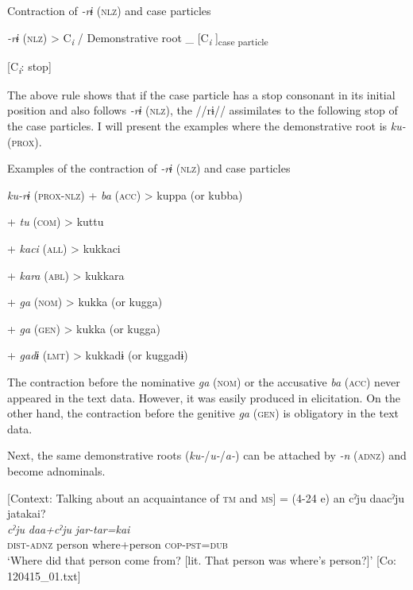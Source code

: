 \ea \label{ex:5:20}   Contraction of \textit{{}-rɨ} (\textsc{nlz}) and case particles

  \textit{{}-rɨ} (\textsc{nlz})  >  C\textit{\textsubscript{i}}  /  Demonstrative root  \_  [C\textit{\textsubscript{i}}      ]\textsubscript{case particle}

                [C\textit{\textsubscript{i}}: stop]
\z

The above rule shows that if the case particle has a stop consonant in its initial position and also follows \textit{{}-rɨ} (\textsc{nlz}), the //rɨ// assimilates to the following stop of the case particles. I will present the examples where the demonstrative root is \textit{ku-} (\textsc{prox}).

\ea \label{ex:5:21}   Examples of the contraction of \textit{{}-rɨ} (\textsc{nlz}) and case particles

  \textit{ku-rɨ}  (\textsc{prox}-\textsc{nlz})  +  \textit{ba}  (\textsc{acc})  >  kuppa  (or kubba)

      +  \textit{tu}  (\textsc{com})  >  kuttu

      +  \textit{kaci}  (\textsc{all})  >  kukkaci

      +  \textit{kara}  (\textsc{abl})  >  kukkara

      +  \textit{ga}  (\textsc{nom})  >  kukka  (or kugga)

      +  \textit{ga}  (\textsc{gen})  >  kukka  (or kugga)

      +  \textit{gadɨ}  (\textsc{lmt})  >  kukkadɨ  (or kuggadɨ)
\z

The contraction before the nominative \textit{ga} (\textsc{nom}) or the accusative \textit{ba} (\textsc{acc}) never appeared in the text data. However, it was easily produced in elicitation. On the other hand, the contraction before the genitive \textit{ga} (\textsc{gen}) is obligatory in the text data.

Next, the same demonstrative roots (\textit{ku-}/\textit{u-}/\textit{a-}) can be attached by \textit{{}-n} (\textsc{adnz}) and become adnominals.

\ea \label{ex:5:22}   [Context: Talking about an acquaintance of \textsc{tm} and \textsc{ms}] = (4-24 e)
\glll  an  cˀju  daacˀju  jatakai?\\
\textit{}  \textit{cˀju}  \textit{daa+cˀju}  \textit{jar-tar=kai}\\
\textsc{dist}-\textsc{adnz}  person  where+person  \textsc{cop}-\textsc{pst}=\textsc{dub}\\
\glt ‘Where did that person come from? [lit. That person was where’s person?]’ [Co: 120415\_01.txt]
\z

